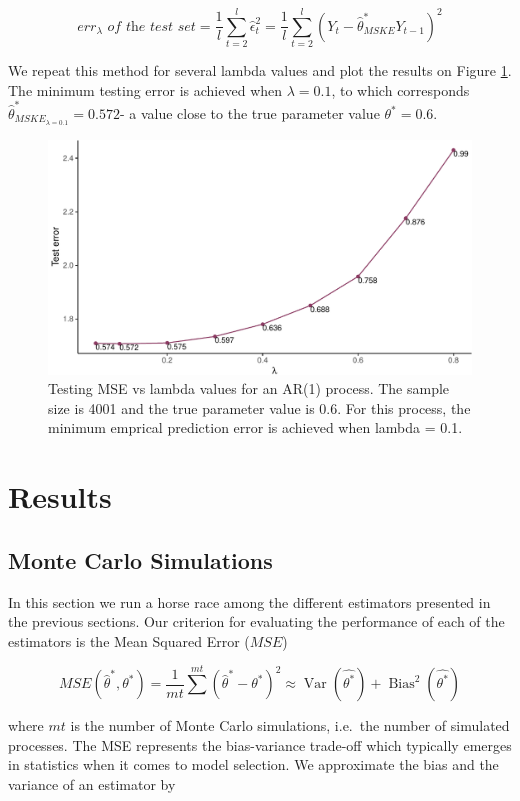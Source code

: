 \documentclass[
  11pt,
]{article}
\begin{document}
\[err_{\lambda} \textit{ of the test set} = \frac{1}{l}\sum_{t = 2}^l \hat \epsilon_t^2 = \frac{1}{l} \sum_{t = 2}^l (Y_t - \hat \theta^*_{MSKE} Y_{t-1})^2\]

We repeat this method for several lambda values and plot the results on
Figure \ref{fig:SH_CV}. The minimum testing error is achieved when
\(\lambda = 0.1\), to which corresponds
\(\hat \theta^*_{MSKE_{\lambda = 0.1}} = 0.572\)- a value close to the
true parameter value \(\theta^* = 0.6\).

\begin{figure}

{\centering \includegraphics[width=0.55\linewidth]{Master_thesis_V3_files/figure-latex/SH_CV-1} 

}

\caption{Testing MSE vs lambda values for an AR(1) process. The sample size is 4001 and the true parameter value is 0.6. For this process, the minimum emprical prediction error is achieved when lambda = 0.1.}\label{fig:SH_CV}
\end{figure}

\hypertarget{results}{%
\section{Results}\label{results}}

\hypertarget{monte-carlo-simulations}{%
\subsection{Monte Carlo Simulations}\label{monte-carlo-simulations}}

In this section we run a horse race among the different estimators
presented in the previous sections. Our criterion for evaluating the
performance of each of the estimators is the Mean Squared Error
(\(MSE\))

\[MSE(\hat \theta^*, \theta^*) =  \frac{1}{mt}\sum^{mt}(\hat \theta^* - \theta^*)^2 \approx \operatorname{Var}(\hat{\theta^*})+\operatorname{Bias}^{2}(\hat{\theta^*})\]

where \(mt\) is the number of Monte Carlo simulations, i.e.~the number
of simulated processes. The MSE represents the bias-variance trade-off
which typically emerges in statistics when it comes to model selection.
We approximate the bias and the variance of an estimator by
\end{document}
